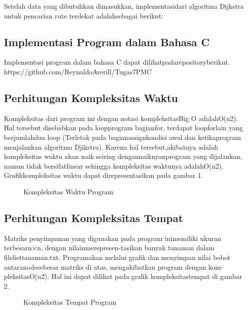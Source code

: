 \documentclass[conference]{IEEEtran}
\begin{document}
Setelah  data  yang  dibutuhkan  dimasukkan,  implementasidari  algoritma  Dijkstra  untuk  pencarian  rute  terdekat  adalahsebagai berikut:

\begin{figure}[htbp]
	\centering
	\resizebox{0.5\textwidth}{!}{}
\end{figure}

\subsection{Implementasi Program dalam Bahasa C}
Implementasi   program   dalam   bahasa   C   dapat   dilihatpadarepositoryberikut.  https://github.com/ReynaldoAverill/Tugas7PMC

\subsection{Perhitungan Kompleksitas Waktu}
Kompleksitas dari program ini dengan notasi kompleksitasBig  O  adalahO(n2).  Hal  tersebut  disebabkan  pada  loopprogram  bagianfor,  terdapat  loopforlain  yang  berjumlahdua loop (Terletak pada bagianassignkondisi awal dan ketikaprogram menjalankan algoritma Djikstra). Karena hal tersebut,akibatnya adalah kompleksitas waktu akan naik seiring dengannaiknyanprogram  yang  dijalankan,  namun  tidak  bersifatlinear sehingga kompleksitas waktunya adalahO(n2). Grafikkompleksitas waktu dapat direpresentasikan pada gambar 1.

\begin{figure}[htbp]
	\centering
	\resizebox{0.5\textwidth}{!}{}
	\caption{Kompleksitas Waktu Program}
\end{figure}

\subsection{Perhitungan Kompleksitas Tempat}
Matriks  penyimpanan  yang  digunakan  pada  program  inimemiliki  ukuran  terbesarn×n,  dengan  nilainmerepresen-tasikan  banyak  tanaman  dalam  filelisttanaman.txt.  Programakan  melalui  grafik  dan  menyimpan  nilai  bobot  antaranodesebesar matriks di atas, mengakibatkan program dengan kom-pleksitasO(n2). Hal ini dapat dilihat pada grafik kompleksitastempat di gambar 2.

\begin{figure}[htbp]
	\centering
	\resizebox{0.5\textwidth}{!}{}
	\caption{Kompleksitas Tempat Program}
\end{figure}
\end{document}
